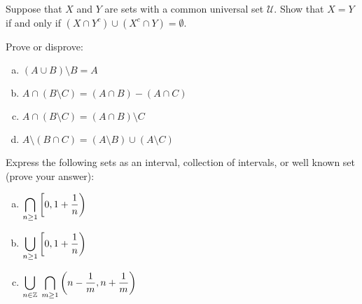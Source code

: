 \documentclass[11pt,letterpaper]{article}
\begin{document}
\newpage





 Suppose that $X$ and $Y$ are sets with a common universal set $\mathscr{U}$. Show that $X= Y$ if and only if $(X \cap Y^c) \cup (X^c \cap Y)= \emptyset$. \pspace





\newpage





 Prove or disprove:
	\begin{enumerate}[(a)]
	\item $(A \cup B) \setminus B= A$
	\item $A \cap (B \setminus C)= (A \cap B) - (A \cap C)$
	\item $A \cap (B \setminus C)= (A \cap B) \setminus C$
	\item $A \setminus (B \cap C)= (A \setminus B) \cup (A \setminus C)$
	\end{enumerate}





\newpage





 Express the following sets as an interval, collection of intervals, or well known set (prove your answer): 
	\begin{enumerate}[(a)]
	\item $\displaystyle\bigcap_{n \geq 1} \left[0, 1 + \frac{1}{n} \right)$
	\item $\displaystyle\bigcup_{n \geq 1} \left[0, 1 + \frac{1}{n} \right)$
	\item $\displaystyle\bigcup_{n \in \mathbb{Z}}\; \bigcap_{m \geq 1} \left( n - \frac{1}{m}, n + \frac{1}{m} \right)$
	\end{enumerate}
\end{document}
